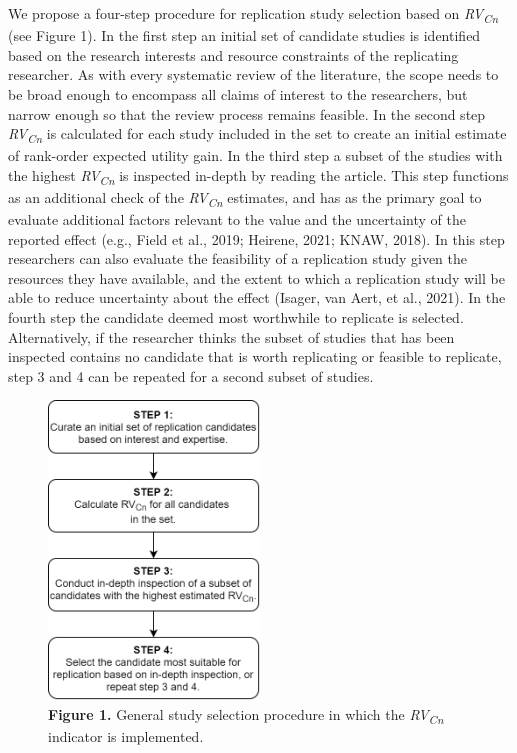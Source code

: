 \documentclass[
  man,floatsintext]{apa6}
\begin{document}
We propose a four-step procedure for replication study selection based on \emph{RV\textsubscript{Cn}} (see Figure 1). In the first step an initial set of candidate studies is identified based on the research interests and resource constraints of the replicating researcher. As with every systematic review of the literature, the scope needs to be broad enough to encompass all claims of interest to the researchers, but narrow enough so that the review process remains feasible. In the second step \emph{RV\textsubscript{Cn}} is calculated for each study included in the set to create an initial estimate of rank-order expected utility gain. In the third step a subset of the studies with the highest \emph{RV\textsubscript{Cn}} is inspected in-depth by reading the article. This step functions as an additional check of the \emph{RV\textsubscript{Cn}} estimates, and has as the primary goal to evaluate additional factors relevant to the value and the uncertainty of the reported effect (e.g., Field et al., 2019; Heirene, 2021; KNAW, 2018). In this step researchers can also evaluate the feasibility of a replication study given the resources they have available, and the extent to which a replication study will be able to reduce uncertainty about the effect (Isager, van Aert, et al., 2021). In the fourth step the candidate deemed most worthwhile to replicate is selected. Alternatively, if the researcher thinks the subset of studies that has been inspected contains no candidate that is worth replicating or feasible to replicate, step 3 and 4 can be repeated for a second subset of studies.

\begin{figure}
\centering
\includegraphics[width=0.5\textwidth,height=\textheight]{Figure_1.png}
\caption{\textbf{Figure 1.} General study selection procedure in which the \emph{RV\textsubscript{Cn}} indicator is implemented.}
\end{figure}
\end{document}
